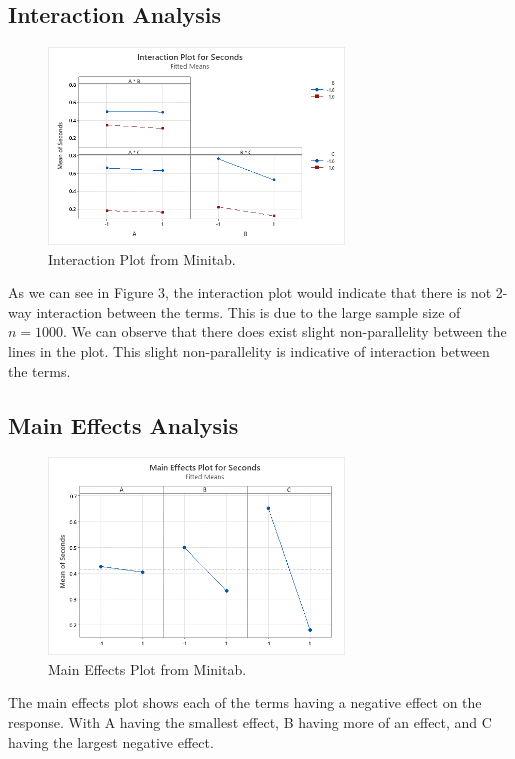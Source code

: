 \documentclass{article}
\begin{document}


\clearpage
\subsection{Interaction Analysis}
  \begin{figure}[h] %
    \centering
    \includegraphics[width=0.7\textwidth]{./images/interaction.png}
    \caption{Interaction Plot from Minitab.}
    \label{fig:interaction}
  \end{figure}
  As we can see in Figure 3, the interaction plot would indicate that there is not 2-way interaction between the terms.
  This is due to the large sample size of $n=1000$. We can observe that there does exist slight non-parallelity between the lines in the plot.
  This slight non-parallelity is indicative of interaction between the terms.
  \subsection{Main Effects Analysis}
  \begin{figure}[h] %
    \centering
    \includegraphics[width=0.7\textwidth]{./images/main_effects.png}
    \caption{Main Effects Plot from Minitab.}
    \label{fig:interaction}
  \end{figure}
  The main effects plot shows each of the terms having a negative effect on the response.
  With A having the smallest effect, B having more of an effect, and C having the largest negative effect.
\clearpage
\end{document}
